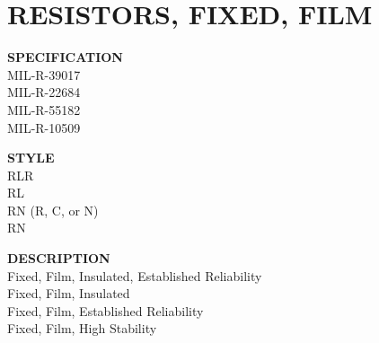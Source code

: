 \section{RESISTORS, FIXED, FILM}

\begin{minipage}[t]{0.21\textwidth}
    \textbf{SPECIFICATION}\\
    MIL-R-39017\\
    MIL-R-22684\\
    MIL-R-55182\\
    MIL-R-10509
\end{minipage}
\begin{minipage}[t]{0.17\textwidth}
    \textbf{STYLE}\\
    RLR\\
    RL\\
    RN (R, C, or N)\\
    RN
\end{minipage}
\begin{minipage}[t]{0.5\textwidth}
    \textbf{DESCRIPTION}\\
    {\fontsize{12pt}{12pt}\selectfont Fixed, Film, Insulated, Established Reliability\\Fixed, Film, Insulated\\Fixed, Film, Established Reliability\\Fixed, Film, High Stability}
\end{minipage}

